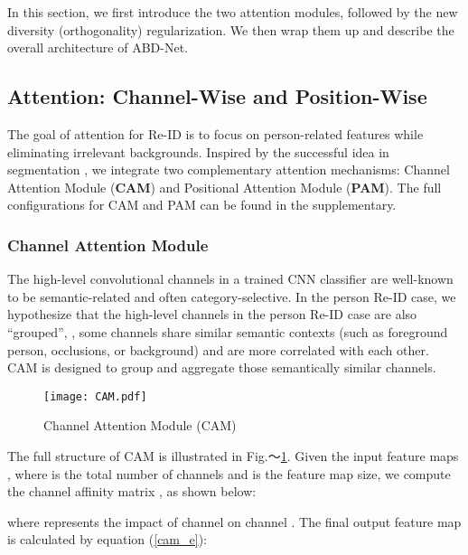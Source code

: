 \documentclass[10pt,twocolumn]{article}
\begin{document}
In this section, we first introduce the two attention modules, followed by the new diversity (orthogonality) regularization. We then wrap them up and describe the overall architecture of ABD-Net.





\subsection{Attention: Channel-Wise and Position-Wise}

The goal of attention for Re-ID is to focus on person-related features while eliminating irrelevant backgrounds. Inspired by the successful idea in segmentation \cite{fu2018dual}, we integrate two complementary attention mechanisms: Channel Attention Module (\textbf{CAM}) and Positional Attention Module (\textbf{PAM}). The full configurations for CAM and PAM can be found in the supplementary.




\subsubsection{Channel Attention Module} \label{sec:cam}

The high-level convolutional channels in a trained CNN classifier are well-known to be semantic-related and often category-selective. In the person Re-ID case, we hypothesize that the high-level channels in the person Re-ID case are also ``grouped'', \ie, some channels share similar semantic contexts (such as foreground person, occlusions, or background) and are more correlated with each other. CAM is designed to group and aggregate those semantically similar channels. 



\begin{figure}[t]
\begin{center}
   \texttt{[image: CAM.pdf]}
\end{center}
   \caption{Channel Attention Module (CAM)}
\label{fig:cam}
\vspace{-1mm}
\end{figure}

The full structure of CAM is illustrated in Fig.～\ref{fig:cam}. Given the input feature maps , where  is the total number of channels and  is the feature map size, we compute the channel affinity matrix , as shown below:

where  represents the impact of channel  on channel . The final output feature map  is calculated by equation (\ref{cam_e}):
\end{document}
